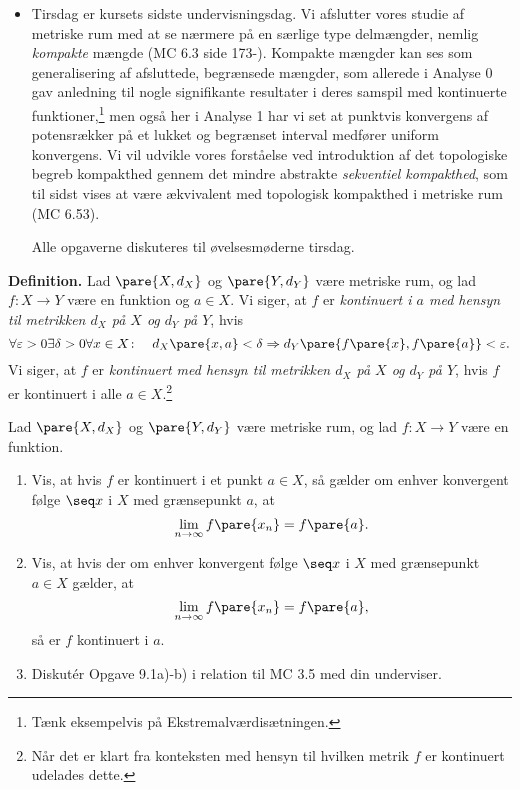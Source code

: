 \setcounter{section}{9}

\begin{itemize}
    \item Tirsdag er kursets sidste undervisningsdag. Vi afslutter vores studie af metriske rum med at se nærmere på en særlige type delmængder, nemlig \textit{kompakte} mængde (MC 6.3 side 173-). Kompakte mængder kan ses som generalisering af afsluttede, begrænsede mængder, som allerede i Analyse 0 gav anledning til nogle signifikante resultater i deres samspil med kontinuerte funktioner,\footnote{Tænk eksempelvis på Ekstremalværdisætningen.} men også her i Analyse 1 har vi set at punktvis konvergens af potensrækker på et lukket og begrænset interval medfører uniform konvergens. Vi vil udvikle vores forståelse ved introduktion af det topologiske begreb kompakthed gennem det mindre abstrakte \textit{sekventiel kompakthed}, som til sidst vises at være ækvivalent med topologisk kompakthed i metriske rum (MC 6.53).
    
    Alle opgaverne diskuteres til øvelsesmøderne tirsdag.
\end{itemize}

\noindent
\textbf{Definition.} Lad $\pare{X,d_X}$ og $\pare{Y,d_Y}$ være metriske rum, og lad $f\colon X\to Y$ være en funktion og $a\in X$.  Vi siger, at $f$ er \textit{kontinuert i $a$ med hensyn til metrikken $d_X$ på $X$ og $d_Y$ på $Y$}, hvis
$$ \forall\varepsilon>0\exists \delta>0\forall x\in X\colon\quad d_X\pare{x,a} < \delta \Rightarrow d_Y\pare{f\pare{x},f\pare{a}} < \varepsilon. $$
Vi siger, at $f$ er \textit{kontinuert med hensyn til metrikken $d_X$ på $X$ og $d_Y$ på $Y$}, hvis $f$ er kontinuert i alle $a\in X$.\footnote{Når det er klart fra konteksten med hensyn til hvilken metrik $f$ er kontinuert udelades dette.}

\begin{opg}
Lad $\pare{X,d_X}$ og $\pare{Y,d_Y}$ være metriske rum, og lad $f\colon X\to Y$ være en funktion.

\begin{enumerate}
    \item Vis, at hvis $f$ er kontinuert i et punkt $a\in X$, så gælder om enhver konvergent følge $\seq x$ i $X$ med grænsepunkt $a$, at
    $$ \lim_{n\to\infty} f\pare{x_n} = f\pare{a}. $$
    
    \item Vis, at hvis der om enhver konvergent følge $\seq x$ i $X$ med grænsepunkt $a\in X$ gælder, at
    $$ \lim_{n\to\infty} f\pare{x_n} = f\pare{a}, $$
    så er $f$ kontinuert i $a$.
    
    \item Diskutér Opgave 9.1a)-b) i relation til MC 3.5 med din underviser.
\end{enumerate}
\end{opg}

